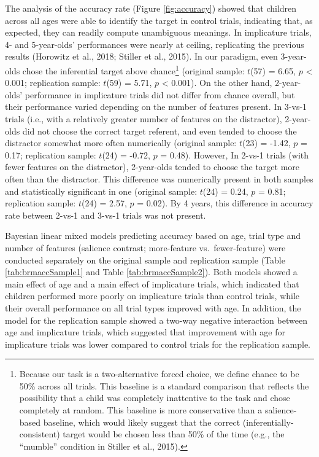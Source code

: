 \documentclass[man]{apa6}
\begin{document}
The analysis of the accuracy rate (Figure \ref{fig:accuracy}) showed
that children across all ages were able to identify the target in
control trials, indicating that, as expected, they can readily compute
unambiguous meanings. In implicature trials, 4- and 5-year-olds'
performances were nearly at ceiling, replicating the previous results
(Horowitz et al., 2018; Stiller et al., 2015). In our paradigm, even
3-year-olds chose the inferential target above chance\footnote{Because
  our task is a two-alternative forced choice, we define chance to be
  50\% across all trials. This baseline is a standard comparison that
  reflects the possibility that a child was completely inattentive to
  the task and chose completely at random. This baseline is more
  conservative than a salience-based baseline, which would likely
  suggest that the correct (inferentially-consistent) target would be
  chosen less than 50\% of the time (e.g., the \enquote{mumble}
  condition in Stiller et al., 2015).} (original sample: \(t\)(57) =
6.65, \(p\) \textless{} 0.001; replication sample: \(t\)(59) = 5.71,
\(p\) \textless{} 0.001). On the other hand, 2-year-olds' performance in
implicature trials did not differ from chance overall, but their
performance varied depending on the number of features present. In
3-vs-1 trials (i.e., with a relatively greater number of features on the
distractor), 2-year-olds did not choose the correct target referent, and
even tended to choose the distractor somewhat more often numerically
(original sample: \(t\)(23) = -1.42, \(p\) = 0.17; replication sample:
\(t\)(24) = -0.72, \(p\) = 0.48). However, In 2-vs-1 trials (with fewer
features on the distractor), 2-year-olds tended to choose the target
more often than the distractor. This difference was numerically present
in both samples and statistically significant in one (original sample:
\(t\)(24) = 0.24, \(p\) = 0.81; replication sample: \(t\)(24) = 2.57,
\(p\) = 0.02). By 4 years, this difference in accuracy rate between
2-vs-1 and 3-vs-1 trials was not present.

Bayesian linear mixed models predicting accuracy based on age, trial
type and number of features (salience contrast; more-feature
vs.~fewer-feature) were conducted separately on the original sample and
replication sample (Table \ref{tab:brmaccSample1} and Table
\ref{tab:brmaccSample2}). Both models showed a main effect of age and a
main effect of implicature trials, which indicated that children
performed more poorly on implicature trials than control trials, while
their overall performance on all trial types improved with age. In
addition, the model for the replication sample showed a two-way negative
interaction between age and implicature trials, which suggested that
improvement with age for implicature trials was lower compared to
control trials for the replication sample.
\end{document}

